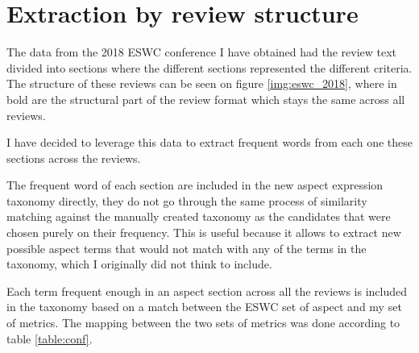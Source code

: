 \section{Extraction by review structure}
The data from the 2018 ESWC conference I have obtained had the review text divided into sections where the different sections represented the different criteria. The structure of these reviews can be seen on figure \ref{img:eswc_2018}, where in bold are the structural part of the review format which stays the same across all reviews. 

I have decided to leverage this data to extract frequent words from each one these sections across the reviews. 

The frequent word of each section are included in the new aspect expression taxonomy directly, they do not go through the same process of similarity matching against the manually created taxonomy as the candidates that were chosen purely on their frequency. This is useful because it allows to extract new possible aspect terms that would not match with any of the terms in the taxonomy, which I originally did not think to  include.

Each term frequent enough in an aspect section across all the reviews is included in the taxonomy based on a match between the ESWC set of aspect and my set of metrics. The mapping between the two sets of metrics was done according to table \ref{table:conf}.

